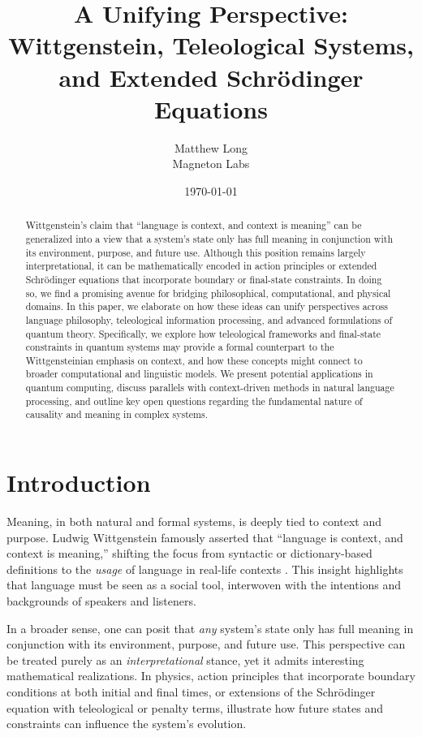 \documentclass[11pt]{article}
\begin{document}
\title{\textbf{A Unifying Perspective: Wittgenstein, Teleological Systems, and Extended Schr\"odinger Equations}}
\author{Matthew Long \\
Magneton Labs}
\date{\today}
\maketitle

\begin{abstract}
Wittgenstein’s claim that ``language is context, and context is meaning'' can be generalized into a view that a system’s state only has full meaning in conjunction with its environment, purpose, and future use. Although this position remains largely interpretational, it can be mathematically encoded in action principles or extended Schr\"odinger equations that incorporate boundary or final-state constraints. In doing so, we find a promising avenue for bridging philosophical, computational, and physical domains. In this paper, we elaborate on how these ideas can unify perspectives across language philosophy, teleological information processing, and advanced formulations of quantum theory. Specifically, we explore how teleological frameworks and final-state constraints in quantum systems may provide a formal counterpart to the Wittgensteinian emphasis on context, and how these concepts might connect to broader computational and linguistic models. We present potential applications in quantum computing, discuss parallels with context-driven methods in natural language processing, and outline key open questions regarding the fundamental nature of causality and meaning in complex systems.
\end{abstract}

\tableofcontents

\section{Introduction}
\label{sec:intro}
Meaning, in both natural and formal systems, is deeply tied to context and purpose. Ludwig Wittgenstein famously asserted that ``language is context, and context is meaning,'' shifting the focus from syntactic or dictionary-based definitions to the \emph{usage} of language in real-life contexts \cite{Wittgenstein1953}. This insight highlights that language must be seen as a social tool, interwoven with the intentions and backgrounds of speakers and listeners. 

In a broader sense, one can posit that \emph{any} system's state only has full meaning in conjunction with its environment, purpose, and future use. This perspective can be treated purely as an \emph{interpretational} stance, yet it admits interesting mathematical realizations. In physics, action principles that incorporate boundary conditions at both initial and final times, or extensions of the Schr\"odinger equation with teleological or penalty terms, illustrate how future states and constraints can influence the system's evolution.
\end{document}
